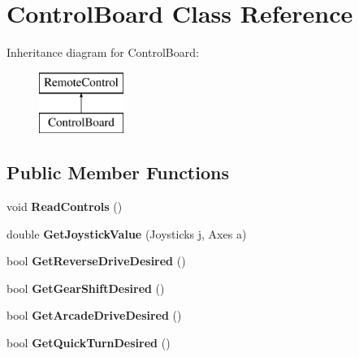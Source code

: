 \hypertarget{class_control_board}{}\section{Control\+Board Class Reference}
\label{class_control_board}
Inheritance diagram for Control\+Board\+:\begin{figure}[H]
\begin{center}
\leavevmode
\includegraphics[height=2.000000cm]{class_control_board}
\end{center}
\end{figure}
\subsection*{Public Member Functions}
\begin{DoxyCompactItemize}
\item 
\mbox{\label{class_control_board_abc38ec1feb7a7c38adfe7ced04fc5a79}} 
void {\bfseries Read\+Controls} ()
\item 
\mbox{\label{class_control_board_a82d4f6abff67ad0ba60b263d65fcc924}} 
double {\bfseries Get\+Joystick\+Value} (Joysticks j, Axes a)
\item 
\mbox{\label{class_control_board_a53f6a067fdec6785017465dba9ee2be6}} 
bool {\bfseries Get\+Reverse\+Drive\+Desired} ()
\item 
\mbox{\label{class_control_board_a49f9d98f58c8f8eb8030910c27b187ed}} 
bool {\bfseries Get\+Gear\+Shift\+Desired} ()
\item 
\mbox{\label{class_control_board_ab32a6888112f807dff75acbb641a3517}} 
bool {\bfseries Get\+Arcade\+Drive\+Desired} ()
\item 
\mbox{\label{class_control_board_ac43151ba49812cc42028c957506a4cc4}} 
bool {\bfseries Get\+Quick\+Turn\+Desired} ()
\end{DoxyCompactItemize}

